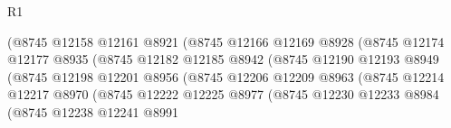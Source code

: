 \begin{lexlean}{R1}
\begin{coremodule}
                                          (@8745
                                            @12158
                                            @12161
                                            @8921
                                            (@8745
                                              @12166
                                              @12169
                                              @8928
                                              (@8745
                                                @12174
                                                @12177
                                                @8935
                                                (@8745
                                                  @12182
                                                  @12185
                                                  @8942
                                                  (@8745
                                                    @12190
                                                    @12193
                                                    @8949
                                                    (@8745
                                                      @12198
                                                      @12201
                                                      @8956
                                                      (@8745
                                                        @12206
                                                        @12209
                                                        @8963
                                                        (@8745
                                                          @12214
                                                          @12217
                                                          @8970
                                                          (@8745
                                                            @12222
                                                            @12225
                                                            @8977
                                                            (@8745
                                                              @12230
                                                              @12233
                                                              @8984
                                                              (@8745
                                                                @12238
                                                                @12241
                                                                @8991

\end{coremodule}
\end{lexlean}
